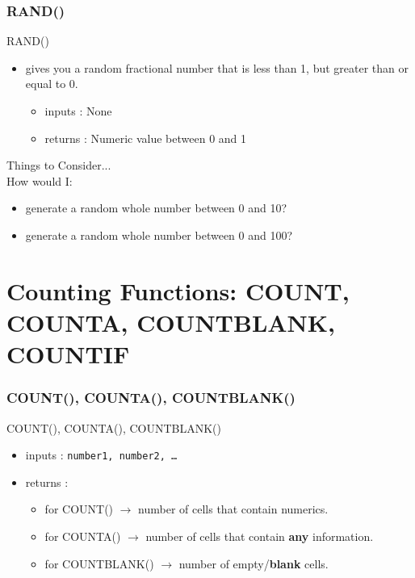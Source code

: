 \documentclass[12pt]{beamer}
\begin{document}
\begin{frame}
\frametitle{RAND()}
 RAND()
\begin{itemize}
	\item gives you a random fractional number that is less than 1, but greater than or equal to 0.
	\begin{itemize}
		\item inputs : None
		\item returns : Numeric value between 0 and 1
	\end{itemize}
\end{itemize}\bigskip
	Things to Consider...\\
	How would I:
	\begin{itemize}
		\item generate a random whole number between 0 and 10?
		\item generate a random whole number between 0 and 100?
	\end{itemize}

\end{frame}
\section{Counting Functions: COUNT, COUNTA, COUNTBLANK, COUNTIF}
\begin{frame}
	\frametitle{COUNT(), COUNTA(), COUNTBLANK()}
	COUNT(), COUNTA(), COUNTBLANK()
		\begin{itemize}
			\item inputs : \texttt{number1, number2, \ldots}
			\item returns : 
			\begin{itemize}
				\item for COUNT() $\rightarrow$ number of cells that contain numerics.
				\item for COUNTA() $\rightarrow$ number of cells that contain \textbf{any} information.
				\item for COUNTBLANK() $\rightarrow$ number of empty/\textbf{blank} cells.
			\end{itemize}
		\end{itemize}
\end{frame}
\end{document}
